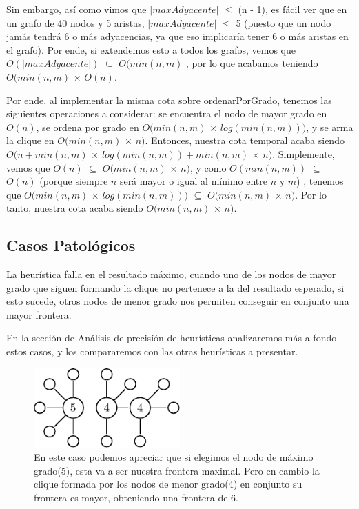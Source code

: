 Sin embargo, así como vimos que $|maxAdyacente|$ $\leq$ (n - 1), es fácil ver que en un grafo de 40 nodos y 5 aristas, $|maxAdyacente|$ $\leq$ 5 (puesto que un nodo jamás tendrá 6 o más adyacencias, ya que eso implicaría tener 6 o más aristas en el grafo). Por ende, si extendemos esto a todos los grafos, vemos que $O(|maxAdyacente|)$ $\subseteq$ $O(min(n,m)$ , por lo que acabamos teniendo $O(min(n,m)$ $\times$ $O(n)$.

Por ende, al implementar la misma cota sobre ordenarPorGrado, tenemos las siguientes operaciones a considerar: se encuentra el nodo de mayor grado en $O(n)$, se ordena por grado en $O(min(n,m)$ $\times$ $log(min(n,m)))$, y se arma la clique en $O(min(n,m)$ $\times$ $n )$.  Entonces, nuestra cota temporal acaba siendo $O(n + min(n,m)$ $\times$ $log(min(n,m)) + min(n,m)$ $\times$ $n )$. Simplemente, vemos que $O(n)$ $\subseteq$ $O(min(n,m)$ $\times$ $n )$, y como $O(min(n,m))$ $\subseteq$ $O(n)$ (porque siempre $n$ será mayor o igual al mínimo entre $n$ y $m$) , tenemos que $O(min(n,m)$ $\times$ $log(min(n,m)))$ $\subseteq$ $O(min(n,m)$ $\times$ $n )$. Por lo tanto, nuestra cota acaba siendo $O(min(n,m)$ $\times$ $n )$.

\subsection{Casos Patológicos}

La heurística falla en el resultado máximo, cuando uno de los nodos de mayor grado que siguen formando la clique no pertenece a la del resultado esperado, si esto sucede, otros nodos de menor grado nos permiten conseguir en conjunto una mayor frontera.

En la sección de Análisis de precisíón de heurísticas analizaremos más a fondo estos casos, y los compararemos con las otras heurísticas a presentar.

\begin{figure}
\caption{En este caso podemos apreciar que si elegimos el nodo de máximo grado(5), esta va a ser nuestra frontera maximal. Pero en cambio la clique formada por los nodos de menor grado(4) en conjunto su frontera es mayor, obteniendo una frontera de 6.}
\includegraphics[width=0.5\textwidth]{img/patologic.pdf}
\end{figure}

